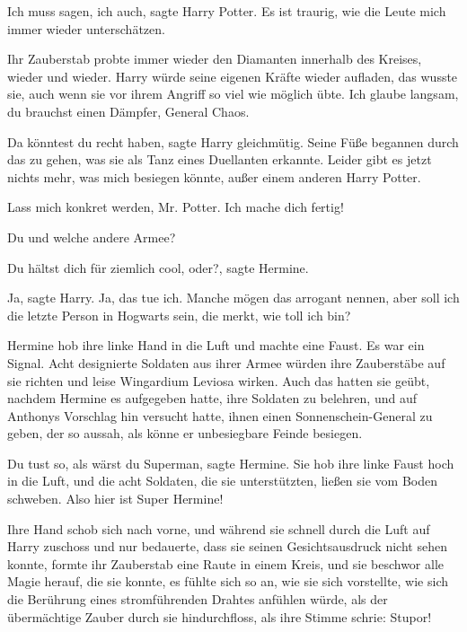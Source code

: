 \glqq{}Ich muss sagen, ich auch\grqq{}, sagte Harry Potter. \glqq{}Es ist traurig,
wie die Leute mich immer wieder unterschätzen.\grqq{}

Ihr Zauberstab probte immer wieder den Diamanten innerhalb des Kreises, wieder
und wieder. Harry würde seine eigenen Kräfte wieder aufladen, das wusste sie,
auch wenn sie vor ihrem Angriff so viel wie möglich übte. \glqq{}Ich glaube
langsam, du brauchst einen Dämpfer, General Chaos.\grqq{}

\glqq{}Da könntest du recht haben\grqq{}, sagte Harry gleichmütig. Seine Füße
begannen durch das zu gehen, was sie als Tanz eines Duellanten erkannte. \glqq{}
Leider gibt es jetzt nichts mehr, was mich besiegen könnte, außer einem anderen
Harry Potter.\grqq{}

\glqq{}Lass mich konkret werden, Mr. Potter. Ich mache dich fertig!\grqq{}

\glqq{}Du und welche andere Armee?\grqq{}

\glqq{}Du hältst dich für ziemlich cool, oder?\grqq{}, sagte Hermine.

\glqq{}Ja\grqq{}, sagte Harry. \glqq{}Ja, das tue ich. Manche mögen das arrogant
nennen, aber soll ich die letzte Person in Hogwarts sein, die merkt, wie toll
ich bin?\grqq{}

Hermine hob ihre linke Hand in die Luft und machte eine Faust. Es war ein
Signal. Acht designierte Soldaten aus ihrer Armee würden ihre Zauberstäbe auf
sie richten und leise Wingardium Leviosa wirken. Auch das hatten sie geübt,
nachdem Hermine es aufgegeben hatte, ihre Soldaten zu belehren, und auf Anthonys
Vorschlag hin versucht hatte, ihnen einen Sonnenschein-General zu geben, der so
aussah, als könne er unbesiegbare Feinde besiegen.

\glqq{}Du tust so, als wärst du Superman\grqq{}, sagte Hermine. Sie hob ihre
linke Faust hoch in die Luft, und die acht Soldaten, die sie unterstützten,
ließen sie vom Boden schweben. \glqq{}Also hier ist Super Hermine!\grqq{}

Ihre Hand schob sich nach vorne, und während sie schnell durch die Luft auf
Harry zuschoss und nur bedauerte, dass sie seinen Gesichtsausdruck nicht sehen
konnte, formte ihr Zauberstab eine Raute in einem Kreis, und sie beschwor alle
Magie herauf, die sie konnte, es fühlte sich so an, wie sie sich vorstellte, wie
sich die Berührung eines stromführenden Drahtes anfühlen würde, als der
übermächtige Zauber durch sie hindurchfloss, als ihre Stimme schrie: \glqq{}
Stupor!\grqq{}

